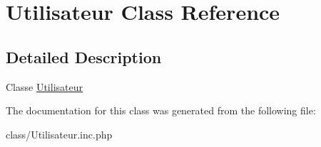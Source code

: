 \hypertarget{class_utilisateur}{
\section{Utilisateur Class Reference}
\label{class_utilisateur}
}


\subsection{Detailed Description}
Classe \hyperlink{class_utilisateur}{Utilisateur} 

The documentation for this class was generated from the following file:\begin{DoxyCompactItemize}
\item 
class/Utilisateur.inc.php\end{DoxyCompactItemize}
